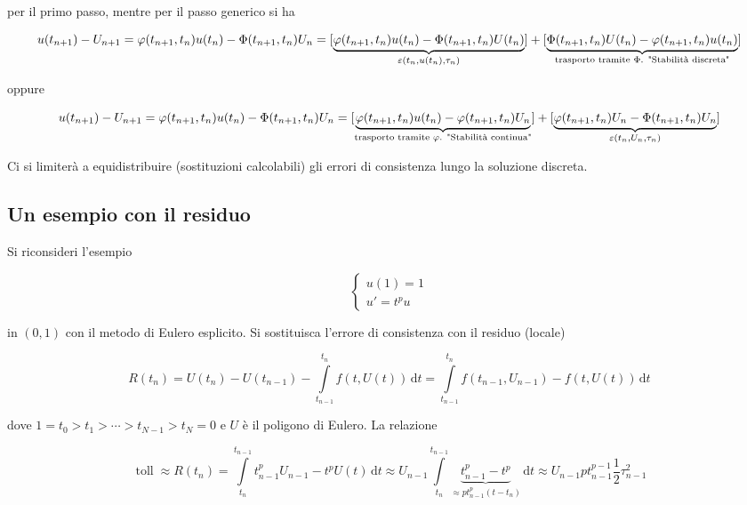 \documentclass[hidelinks, 10pt]{report}
\begin{document}
per il primo passo, mentre per il passo generico si ha

\begin{dmath*}
u(t_{n + 1}) - U_{n + 1} = \varphi(t_{n + 1}, t_{n}) u(t_{n}) - \Phi (t_{n + 1}, t_{n}) U_{n} = [ \underbrace{\varphi(t_{n + 1}, t_{n}) u(t_{n}) - \Phi (t_{n + 1}, t_{n}) U(t_{n})}_{\varepsilon(t_{n}, u(t_{n}), \tau_{n})}] + [\underbrace{\Phi (t_{n + 1}, t_{n}) U(t_{n}) - \varphi(t_{n + 1}, t_{n}) u(t_{n})}_{\text{trasporto tramite $ \Phi $. "Stabilit\`a discreta"}}]
\end{dmath*}

oppure

\begin{dmath*}
u(t_{n + 1}) - U_{n + 1} = \varphi(t_{n + 1}, t_{n}) u(t_{n}) - \Phi (t_{n + 1}, t_{n}) U_{n} = [ \underbrace{\varphi(t_{n + 1}, t_{n}) u(t_{n}) - \varphi (t_{n + 1}, t_{n}) U_{n}}_{\text{trasporto tramite $ \varphi $. "Stabilit\`a continua"}}] + [\underbrace{\varphi (t_{n + 1}, t_{n}) U_{n} - \Phi(t_{n + 1}, t_{n}) U_{n}}_{\varepsilon(t_{n}, U_{n}, \tau_{n})}]
\end{dmath*}

Ci si limiter\`a a equidistribuire (sostituzioni calcolabili) gli errori di consistenza lungo la soluzione discreta.

\subsection{Un esempio con il residuo}
Si riconsideri l'esempio

\[
\begin{cases}
u(1) = 1 \\
u' = t^{p} u
\end{cases}
\]

in $ (0, 1) $ con il metodo di Eulero esplicito. Si sostituisca l'errore di consistenza con il residuo (locale)

\[ R(t_{n}) = U(t_{n}) - U(t_{n - 1}) - \int\limits_{t_{n - 1}}^{t_{n}} f(t, U(t)) \, \mathrm{d}t = \int\limits_{t_{n - 1}}^{t_{n}} f(t_{n - 1}, U_{n - 1}) - f(t, U(t)) \, \mathrm{d}t \] 

dove $ 1 = t_{0} > t_{1} > \dotsb > t_{N - 1} > t_{N} = 0 $ e $ U $ \`e il poligono di Eulero. La relazione

\[ \mathop{toll} \approx R(t_{n}) = \int\limits_{t_{n}}^{t_{n - 1}} t_{n -1}^{p} U_{n - 1} - t^{p} U(t) \, \mathrm{d}t \approx U_{n - 1} \int\limits_{t_{n}}^{t_{n - 1}} \underbrace{t_{n - 1}^{p} - t^{p}}_{\approx p t_{n - 1}^{p} (t - t_{n})} \, \mathrm{d}t \approx U_{n - 1} p t_{n - 1}^{p - 1} \frac{1}{2} \tau_{n - 1}^{2} \]
\end{document}
